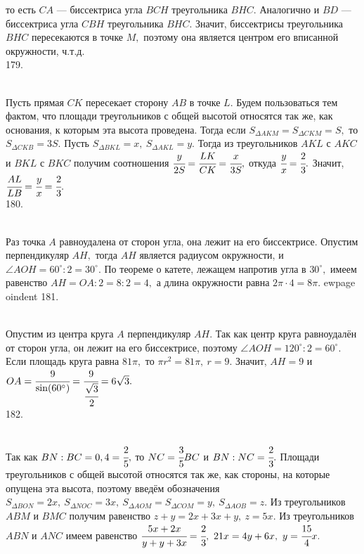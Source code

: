 то есть $CA$ --- биссектриса угла $BCH$ треугольника $BHC.$
Аналогично и $BD$ --- биссектриса угла $CBH$ треугольника $BHC.$ Значит, биссектрисы треугольника $BHC$ пересекаются в точке $M,$ поэтому она является центром его вписанной окружности, ч.т.д.\\
179. \begin{figure}[ht!]
\end{figure}\\
Пусть прямая $CK$ пересекает сторону $AB$ в точке $L.$ Будем пользоваться тем фактом, что площади треугольников с общей высотой относятся так же, как основания, к которым эта высота проведена. Тогда если $S_{\Delta AKM}=S_{\Delta CKM}=S,$ то $S_{\Delta CKB}=3S.$ Пусть $S_{\Delta BKL}=x,\ S_{\Delta AKL}=y.$ Тогда из треугольников $AKL$ с $AKC$ и $BKL$ с $BKC$ получим соотношения $\cfrac{y}{2S}=\cfrac{LK}{CK}=\cfrac{x}{3S},$ откуда $\cfrac{y}{x}=\cfrac{2}{3}.$ Значит, $\cfrac{AL}{LB}=\cfrac{y}{x}=\cfrac{2}{3}.$\\
180. \begin{figure}[ht!]
\end{figure}\\
Раз точка $A$ равноудалена от сторон угла, она лежит на его биссектрисе. Опустим перпендикуляр $AH,$ тогда $AH$ является радиусом окружности, и $\angle AOH=60^\circ:2=30^\circ.$ По теореме о катете, лежащем напротив угла в $30^\circ,$ имеем равенство $AH=OA:2=8:2=4,$ а длина окружности равна $2\pi\cdot4=8\pi.$
ewpage
oindent
181. \begin{figure}[ht!]
\end{figure}\\
Опустим из центра круга $A$ перпендикуляр $AH.$ Так как центр круга равноудалён от сторон угла, он лежит на его биссектрисе, поэтому $\angle AOH=120^\circ:2=60^\circ.$ Если площадь круга равна $81\pi,$ то $\pi r^2=81\pi,\ r=9.$ Значит, $AH=9$ и $OA=\cfrac{9}{\sin(60^\circ)}=\cfrac{9}{\cfrac{\sqrt{3}}{2}}=6\sqrt{3}.$\\
182. \begin{figure}[ht!]
\end{figure}\\
Так как $BN:BC=0,4=\cfrac{2}{5},$ то $NC=\cfrac{3}{5}BC$ и $BN:NC=\cfrac{2}{3}.$ Площади треугольников с общей высотой относятся так же, как стороны, на которые опущена эта высота, поэтому введём обозначения $S_{\Delta BON}=2x,\ S_{\Delta NOC}=3x,\ S_{\Delta AOM}=S_{\Delta COM}=y,\ S_{\Delta AOB}=z.$ Из треугольников $ABM$ и $BMC$ получим равенство $z+y=2x+3x+y,\ z=5x.$ Из треугольников $ABN$ и $ANC$ имеем равенство $\cfrac{5x+2x}{y+y+3x}=\cfrac{2}{3},\ 21x=4y+6x,\ y=\cfrac{15}{4}x.$

